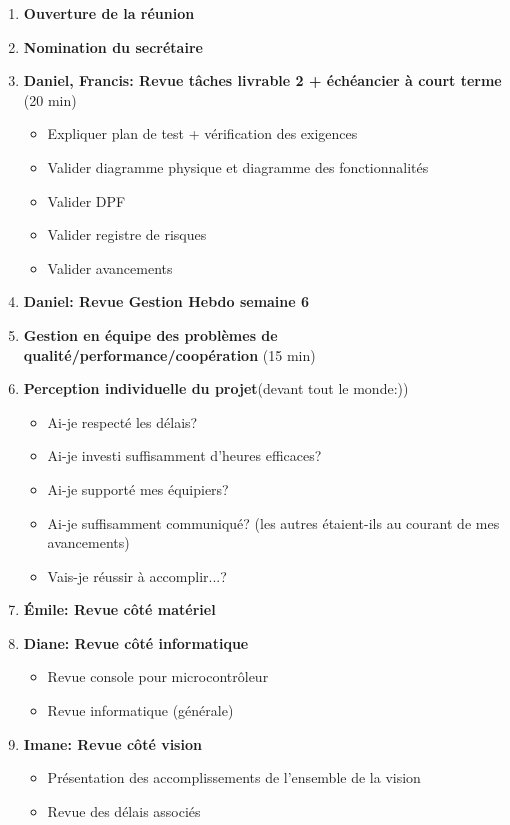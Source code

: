 \documentclass[12pt]{ULojpv}
\begin{document}
\entete
\begin{enumerate}
   \item \textbf{Ouverture de la réunion}
   \item \textbf{Nomination du secrétaire}
   \item \textbf{Daniel, Francis: Revue tâches livrable 2 + échéancier à court terme} (20 min)
   \begin{itemize}
   \item Expliquer plan de test + vérification des exigences
   \item Valider diagramme physique et diagramme des fonctionnalités
   \item Valider DPF
   \item Valider registre de risques
   \item Valider avancements
   \end{itemize}
   \item \textbf{Daniel: Revue Gestion Hebdo semaine 6}
   \item \textbf{Gestion en équipe des problèmes de qualité/performance/coopération} (15 min)
   \item\textbf{Perception individuelle du projet}(devant tout le monde:)) 
   \begin{itemize}
   \item Ai-je respecté les délais?
   \item Ai-je investi suffisamment d'heures efficaces?
   \item Ai-je supporté mes équipiers?
   \item Ai-je suffisamment communiqué? (les autres étaient-ils au courant de mes avancements)
   \item Vais-je réussir à accomplir...?
   \end{itemize}
   \item \textbf{Émile: Revue côté matériel}
   \item \textbf{Diane: Revue côté informatique}
   \begin{itemize}
   \item Revue console pour microcontrôleur
   \item Revue informatique (générale)
   \end{itemize}
   \item\textbf{Imane: Revue côté vision}
   \begin{itemize}
   \item Présentation des accomplissements de l'ensemble de la vision
   \item Revue des délais associés

\end{itemize}
\end{enumerate}
\end{document}
